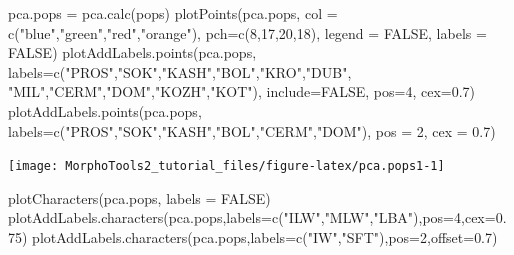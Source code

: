 \documentclass[
  11pt,
  a4paper]{article}
\newenvironment{Shaded}{\begin{snugshade}}{\end{snugshade}}
\newcommand{\AttributeTok}[1]{\textcolor[rgb]{0.77,0.63,0.00}{#1}}
\newcommand{\ConstantTok}[1]{\textcolor[rgb]{0.00,0.00,0.00}{#1}}
\newcommand{\DecValTok}[1]{\textcolor[rgb]{0.00,0.00,0.81}{#1}}
\newcommand{\FloatTok}[1]{\textcolor[rgb]{0.00,0.00,0.81}{#1}}
\newcommand{\FunctionTok}[1]{\textcolor[rgb]{0.00,0.00,0.00}{#1}}
\newcommand{\NormalTok}[1]{#1}
\newcommand{\OtherTok}[1]{\textcolor[rgb]{0.56,0.35,0.01}{#1}}
\newcommand{\StringTok}[1]{\textcolor[rgb]{0.31,0.60,0.02}{#1}}
\begin{document}
\begin{Shaded}
\begin{Highlighting}[]
\NormalTok{pca.pops }\OtherTok{=} \FunctionTok{pca.calc}\NormalTok{(pops)}
\FunctionTok{plotPoints}\NormalTok{(pca.pops, }\AttributeTok{col =} \FunctionTok{c}\NormalTok{(}\StringTok{"blue"}\NormalTok{,}\StringTok{"green"}\NormalTok{,}\StringTok{"red"}\NormalTok{,}\StringTok{"orange"}\NormalTok{), }\AttributeTok{pch=}\FunctionTok{c}\NormalTok{(}\DecValTok{8}\NormalTok{,}\DecValTok{17}\NormalTok{,}\DecValTok{20}\NormalTok{,}\DecValTok{18}\NormalTok{), }
            \AttributeTok{legend =} \ConstantTok{FALSE}\NormalTok{, }\AttributeTok{labels =} \ConstantTok{FALSE}\NormalTok{)}
\FunctionTok{plotAddLabels.points}\NormalTok{(pca.pops, }\AttributeTok{labels=}\FunctionTok{c}\NormalTok{(}\StringTok{"PROS"}\NormalTok{,}\StringTok{"SOK"}\NormalTok{,}\StringTok{"KASH"}\NormalTok{,}\StringTok{"BOL"}\NormalTok{,}\StringTok{"KRO"}\NormalTok{,}\StringTok{"DUB"}\NormalTok{,}
          \StringTok{"MIL"}\NormalTok{,}\StringTok{"CERM"}\NormalTok{,}\StringTok{"DOM"}\NormalTok{,}\StringTok{"KOZH"}\NormalTok{,}\StringTok{"KOT"}\NormalTok{), }\AttributeTok{include=}\ConstantTok{FALSE}\NormalTok{, }\AttributeTok{pos=}\DecValTok{4}\NormalTok{, }\AttributeTok{cex=}\FloatTok{0.7}\NormalTok{)}
\FunctionTok{plotAddLabels.points}\NormalTok{(pca.pops, }\AttributeTok{labels=}\FunctionTok{c}\NormalTok{(}\StringTok{"PROS"}\NormalTok{,}\StringTok{"SOK"}\NormalTok{,}\StringTok{"KASH"}\NormalTok{,}\StringTok{"BOL"}\NormalTok{,}\StringTok{"CERM"}\NormalTok{,}\StringTok{"DOM"}\NormalTok{), }
                      \AttributeTok{pos =} \DecValTok{2}\NormalTok{, }\AttributeTok{cex =} \FloatTok{0.7}\NormalTok{)}
\end{Highlighting}
\end{Shaded}

\begin{center}\texttt{[image: MorphoTools2\_tutorial\_files/figure-latex/pca.pops1-1]} \end{center}

\begin{Shaded}
\begin{Highlighting}[]
\FunctionTok{plotCharacters}\NormalTok{(pca.pops, }\AttributeTok{labels =} \ConstantTok{FALSE}\NormalTok{)}
\FunctionTok{plotAddLabels.characters}\NormalTok{(pca.pops,}\AttributeTok{labels=}\FunctionTok{c}\NormalTok{(}\StringTok{"ILW"}\NormalTok{,}\StringTok{"MLW"}\NormalTok{,}\StringTok{"LBA"}\NormalTok{),}\AttributeTok{pos=}\DecValTok{4}\NormalTok{,}\AttributeTok{cex=}\FloatTok{0.75}\NormalTok{)}
\FunctionTok{plotAddLabels.characters}\NormalTok{(pca.pops,}\AttributeTok{labels=}\FunctionTok{c}\NormalTok{(}\StringTok{"IW"}\NormalTok{,}\StringTok{"SFT"}\NormalTok{),}\AttributeTok{pos=}\DecValTok{2}\NormalTok{,}\AttributeTok{offset=}\FloatTok{0.7}\NormalTok{)}
\end{Highlighting}
\end{Shaded}
\end{document}
